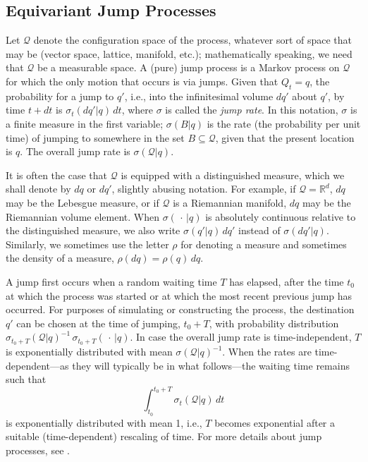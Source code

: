 \documentclass[12pt]{article}
\newcommand{\RRR}{\mathbb{R}} %
\newcommand{\1}{\mathbf{1}} %
\newcommand{\conf}{\mathcal{Q}} %
\begin{document}
\subsection{Equivariant Jump Processes}\label{sec:revjump}

Let $\conf$ denote the configuration space of the process,
whatever sort of space that may be (vector space, lattice, manifold,
etc.); mathematically speaking, we need that $\conf$ be a measurable
space.  A (pure) jump process is a Markov process on $\conf$ for which
the only motion that occurs is via jumps. Given that $Q_t =q$, the
probability for a jump to $q'$, i.e., into the infinitesimal volume
$dq'$ about $q'$, by time $t+dt$ is $\sigma_t(dq'|q)\, dt$, where
$\sigma$ is called the \emph{jump rate}. In this notation, $\sigma$ is
a finite measure in the first variable; $\sigma(B|q)$ is the rate (the
probability per unit time) of jumping to somewhere in the set
$B\subseteq\conf$, given that the present location is $q$. The overall
jump rate is $\sigma(\conf|q)$.

It is often the case that $\conf$ is equipped with a distinguished
measure, which we shall denote by $dq$ or $dq'$, slightly abusing
notation.  For example, if $\conf = \RRR^d$, $dq$ may be the Lebesgue
measure, or if $\conf$ is a Riemannian manifold, $dq$ may be the
Riemannian volume element. When $\sigma(\,\cdot\,|q)$ is absolutely
continuous relative to the distinguished measure, we also write
$\sigma(q'|q)\, dq'$ instead of $\sigma(dq'|q)$.  Similarly, we
sometimes use the letter $\rho$ for denoting a measure and sometimes
the density of a measure, $\rho(dq) = \rho(q)\,dq$.

A jump first occurs when a random waiting time $T$ has elapsed, after 
the
time $t_0$ at which the process was started or at which the most
recent previous jump has occurred.  For purposes of simulating or
constructing the process, the destination $q'$ can be chosen at the
time of jumping, $t_0 + T$, with probability distribution
$\sigma_{t_0+T} (\conf|q)^{-1} \, \sigma_{t_0+T} (\,\cdot\,|q)$. In
case the overall jump rate is time-independent, $T$ is exponentially
distributed with mean $\sigma(\conf|q)^{-1}$. When the
rates are time-dependent---as they will typically be in what
follows---the waiting time remains such that
\[
   \int_{t_0}^{t_0+T} \sigma_t(\conf|q) \, dt
\]
is exponentially distributed with mean 1, i.e., $T$ becomes
exponential after a suitable (time-dependent) rescaling of time. For
more details about jump processes, see \cite{Breiman}.
\end{document}

